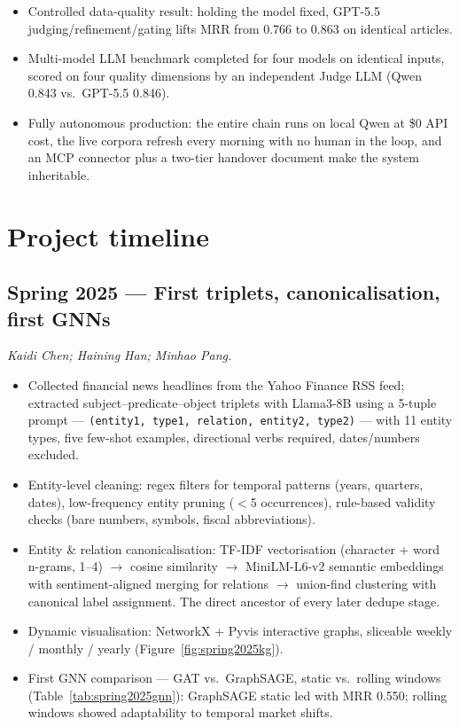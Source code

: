 \documentclass[11pt]{article}
\begin{document}
\begin{itemize}
\begin{itemize}
      \item Controlled data-quality result: holding the model fixed, GPT-5.5 judging/refinement/gating lifts MRR from 0.766 to 0.863 on identical articles.
      \item Multi-model LLM benchmark completed for four models on identical inputs, scored on four quality dimensions by an independent Judge LLM (Qwen 0.843 vs.\ GPT-5.5 0.846).
      \item Fully autonomous production: the entire chain runs on local Qwen at \$0 API cost, the live corpora refresh every morning with no human in the loop, and an MCP connector plus a two-tier handover document make the system inheritable.
    \end{itemize}
\end{itemize}

\section{Project timeline}
\label{sec:timeline}

\subsection{Spring 2025 --- First triplets, canonicalisation, first GNNs}
\emph{Kaidi Chen; Haining Han; Minhao Pang.}

\begin{itemize}
  \item Collected financial news headlines from the Yahoo Finance RSS feed; extracted subject--predicate--object triplets with Llama3-8B using a 5-tuple prompt --- \texttt{(entity1, type1, relation, entity2, type2)} --- with 11 entity types, five few-shot examples, directional verbs required, dates/numbers excluded.
  \item Entity-level cleaning: regex filters for temporal patterns (years, quarters, dates), low-frequency entity pruning (\(<\)5 occurrences), rule-based validity checks (bare numbers, symbols, fiscal abbreviations).
  \item Entity \& relation canonicalisation: TF-IDF vectorisation (character + word n-grams, 1--4) \(\to\) cosine similarity \(\to\) MiniLM-L6-v2 semantic embeddings with sentiment-aligned merging for relations \(\to\) union-find clustering with canonical label assignment. The direct ancestor of every later dedupe stage.
  \item Dynamic visualisation: NetworkX + Pyvis interactive graphs, sliceable weekly / monthly / yearly (Figure~\ref{fig:spring2025kg}).
  \item First GNN comparison --- GAT vs.\ GraphSAGE, static vs.\ rolling windows (Table~\ref{tab:spring2025gnn}): GraphSAGE static led with MRR 0.550; rolling windows showed adaptability to temporal market shifts.
\end{itemize}
\end{document}
